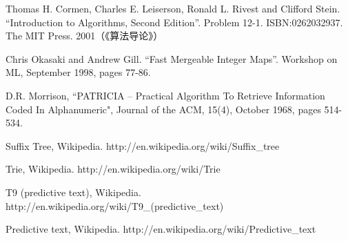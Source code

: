 \documentclass[UTF8]{article}
\begin{document}
\ifx\wholebook\relax\else
\begin{thebibliography}{99}

Thomas H. Cormen, Charles E. Leiserson, Ronald L. Rivest and Clifford Stein.
``Introduction to Algorithms, Second Edition''. Problem 12-1. ISBN:0262032937. The MIT Press. 2001（《算法导论》）

Chris Okasaki and Andrew Gill. ``Fast Mergeable Integer Maps''. Workshop on ML, September 1998, pages 77-86.

D.R. Morrison, ``PATRICIA -- Practical Algorithm To Retrieve  Information Coded In Alphanumeric", Journal of the ACM, 15(4), October 1968, pages 514-534.

Suffix Tree, Wikipedia. http://en.wikipedia.org/wiki/Suffix\_tree

Trie, Wikipedia. http://en.wikipedia.org/wiki/Trie

T9 (predictive text), Wikipedia. http://en.wikipedia.org/wiki/T9\_(predictive\_text)

Predictive text,
Wikipedia. http://en.wikipedia.org/wiki/Predictive\_text

\end{thebibliography}
\end{document}
